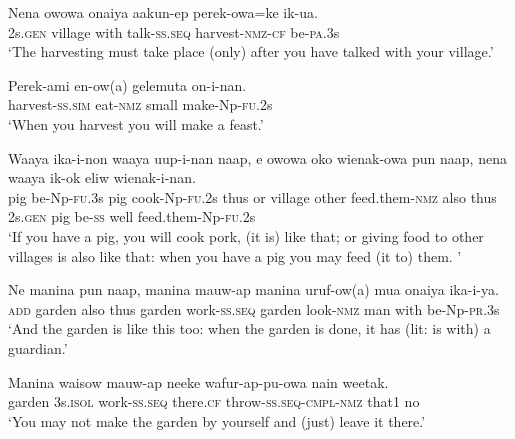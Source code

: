 
\ea\label{ex:a:x19}
\gll  Nena  owowa  onaiya  aakun-ep  perek-owa=ke  ik-ua. \\
2s.\textsc{gen}  village  with  talk-\textsc{ss.seq}  harvest-\textsc{nmz}-\textsc{cf}  be-\textsc{pa}.3s \\
\glt ‘The harvesting must take place (only) after you have talked with your village.’ \\
\z


\ea\label{ex:a:x20}
\gll  Perek-ami  en-ow(a)  gelemuta  on-i-nan. \\
harvest-\textsc{ss}.\textsc{sim}  eat-\textsc{nmz}  small  make-Np-\textsc{fu}.2s \\
\glt ‘When you harvest you will make a feast.’ \\
\z


\ea\label{ex:a:x21}
\gll  Waaya  ika-i-non  waaya  uup-i-nan  naap,  e  owowa  oko   wienak-owa  pun  naap,  nena  waaya  ik-ok  eliw  wienak-i-nan. \\
pig  be-Np-\textsc{fu}.3s  pig  cook-Np-\textsc{fu}.2s  thus  or  village  other   feed.them-\textsc{nmz}  also  thus  2s.\textsc{gen}  pig  be-\textsc{ss}  well  feed.them-Np-\textsc{fu}.2s \\


\glt ‘If you have a pig, you will cook pork, (it is) like that; or giving food to other villages is also like that: when you have a pig you may feed (it to) them. ’ \\
\z


\ea\label{ex:a:x22}
\gll  Ne  manina  pun  naap,  manina  mauw-ap  manina  uruf-ow(a)  mua onaiya  ika-i-ya. \\
\textsc{add}  garden  also  thus  garden  work-\textsc{ss.seq}  garden  look-\textsc{nmz}  man    with  be-Np-\textsc{pr}.3s \\


\glt ‘And the garden is like this too: when the garden is done, it has (lit: is with) a guardian.’ \\
\z


\ea\label{ex:a:x23}
\gll  Manina  waisow  mauw-ap  neeke  wafur-ap-pu-owa          nain  weetak. \\
garden  3s.\textsc{isol}  work-\textsc{ss.seq}  there.\textsc{cf}  throw-\textsc{ss.seq}-\textsc{cmpl}-\textsc{nmz}  that1  no \\


\glt ‘You may not make the garden by yourself and (just) leave it there.’ \\
\z


